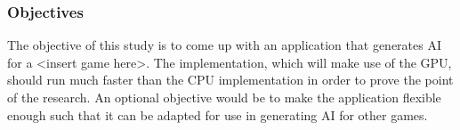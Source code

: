 \subsubsection*{Objectives}
The objective of this study is to come up with an application that generates AI for
a <insert game here>. The implementation, which will make use of the GPU, should run
much faster than the CPU implementation in order to prove the point of the research.
An optional objective would be to make the application flexible enough such that it
can be adapted for use in generating AI for other games.